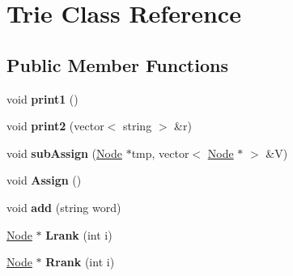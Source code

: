 \hypertarget{classTrie}{
\section{Trie Class Reference}
\label{classTrie}
}
\subsection*{Public Member Functions}
\begin{DoxyCompactItemize}
\item 
\hypertarget{classTrie_ac1c307a638eb2eb12c1a2f6909a4ce79}{
void {\bfseries print1} ()}
\label{classTrie_ac1c307a638eb2eb12c1a2f6909a4ce79}

\item 
\hypertarget{classTrie_aa3da1484e7ede6d41373fdd5b4347cac}{
void {\bfseries print2} (vector$<$ string $>$ \&r)}
\label{classTrie_aa3da1484e7ede6d41373fdd5b4347cac}

\item 
\hypertarget{classTrie_af0ebc8b62fe7c409a9d6a196421e7a7e}{
void {\bfseries subAssign} (\hyperlink{classNode}{Node} $\ast$tmp, vector$<$ \hyperlink{classNode}{Node} $\ast$ $>$ \&V)}
\label{classTrie_af0ebc8b62fe7c409a9d6a196421e7a7e}

\item 
\hypertarget{classTrie_a0d6a3dbcce7c01002b446a3e166aaa03}{
void {\bfseries Assign} ()}
\label{classTrie_a0d6a3dbcce7c01002b446a3e166aaa03}

\item 
\hypertarget{classTrie_a20b7cdac61b5f16f1075467056ecb546}{
void {\bfseries add} (string word)}
\label{classTrie_a20b7cdac61b5f16f1075467056ecb546}

\item 
\hypertarget{classTrie_af6e3af6f347cb0865749ff82a2a2ed2b}{
\hyperlink{classNode}{Node} $\ast$ {\bfseries Lrank} (int i)}
\label{classTrie_af6e3af6f347cb0865749ff82a2a2ed2b}

\item 
\hypertarget{classTrie_acfdce57864535d4373a66770d3a7e576}{
\hyperlink{classNode}{Node} $\ast$ {\bfseries Rrank} (int i)}
\label{classTrie_acfdce57864535d4373a66770d3a7e576}

\end{DoxyCompactItemize}

